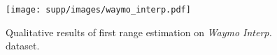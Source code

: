 \begin{figure}[t]
\centering
\texttt{[image: supp/images/waymo\_interp.pdf]}

\caption{Qualitative results of first range estimation on \textit{Waymo Interp.} dataset.}
\label{fig:iccv_supp_waymo_interp}

\end{figure}